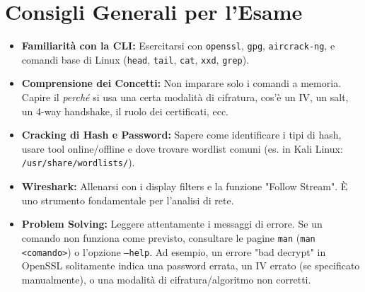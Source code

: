 \section{Consigli Generali per l'Esame}
\begin{itemize}
    \item \textbf{Familiarità con la CLI:} Esercitarsi con \texttt{openssl}, \texttt{gpg}, \texttt{aircrack-ng}, e comandi base di Linux (\texttt{head}, \texttt{tail}, \texttt{cat}, \texttt{xxd}, \texttt{grep}).
    \item \textbf{Comprensione dei Concetti:} Non imparare solo i comandi a memoria. Capire il \textit{perché} si usa una certa modalità di cifratura, cos'è un IV, un salt, un 4-way handshake, il ruolo dei certificati, ecc.
    \item \textbf{Cracking di Hash e Password:} Sapere come identificare i tipi di hash, usare tool online/offline e dove trovare wordlist comuni (es. in Kali Linux: \texttt{/usr/share/wordlists/}).
    \item \textbf{Wireshark:} Allenarsi con i display filters e la funzione "Follow Stream". È uno strumento fondamentale per l'analisi di rete.
    \item \textbf{Problem Solving:} Leggere attentamente i messaggi di errore. Se un comando non funziona come previsto, consultare le pagine \texttt{man} (\texttt{man <comando>}) o l'opzione \texttt{--help}. Ad esempio, un errore "bad decrypt" in OpenSSL solitamente indica una password errata, un IV errato (se specificato manualmente), o una modalità di cifratura/algoritmo non corretti.
\end{itemize}

